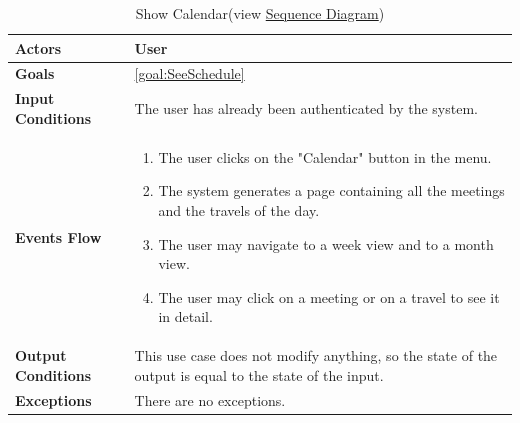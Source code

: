 \begin{table}[H]
	\centering
	\def\arraystretch{1.5}
	\begin{tabular}{|m{7cm}|m{7cm}|}
		\hline
		\textbf{Actors}            & User		    \\ \hline
		\textbf{Goals}             & \ref{goal:SeeSchedule}           \\ \hline
		\textbf{Input Conditions}  & The user has already been authenticated by the system.           \\ \hline
		\textbf{Events Flow}       & 
			\begin{enumerate}[topsep=0pt, leftmargin=*]
				\item The user clicks on the "Calendar" button in the menu.
				\item The system generates a page containing all the meetings and the travels of the day.
				\item The user may navigate to a week view and to a month view.
				\item The user may click on a meeting or on a travel to see it in detail.
			\end{enumerate}	           \\ \hline
		\textbf{Output Conditions} & This use case does not modify anything, so the state of the output is equal to the state of the input.           \\ \hline
		\textbf{Exceptions}        & There are no exceptions.           \\ \hline
	\end{tabular}
	\caption[Show Calendar]{{Show Calendar}\label{UseCaseDescr:ShowCalendar} (view \hyperref[SeqDiagr:ShowCalendar]{Sequence Diagram})}
\end{table}

